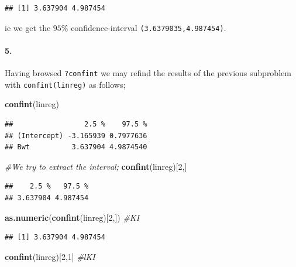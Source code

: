 \documentclass[
]{article}
\newenvironment{Shaded}{\begin{snugshade}}{\end{snugshade}}
\newcommand{\CommentTok}[1]{\textcolor[rgb]{0.56,0.35,0.01}{\textit{#1}}}
\newcommand{\DecValTok}[1]{\textcolor[rgb]{0.00,0.00,0.81}{#1}}
\newcommand{\KeywordTok}[1]{\textcolor[rgb]{0.13,0.29,0.53}{\textbf{#1}}}
\newcommand{\NormalTok}[1]{#1}
\begin{document}
\begin{verbatim}
## [1] 3.637904 4.987454
\end{verbatim}

ie we get the \(95\%\) confidence-interval
\texttt{(3.6379035,4.987454)}.

\hypertarget{section-7}{%
\paragraph{\texorpdfstring{\textbf{5.}}{5.}}\label{section-7}}

Having browsed \texttt{?confint} we may refind the results of the
previous subproblem with \texttt{confint(linreg)} as follows;

\begin{Shaded}
\begin{Highlighting}[]
\KeywordTok{confint}\NormalTok{(linreg)}
\end{Highlighting}
\end{Shaded}

\begin{verbatim}
##                 2.5 %    97.5 %
## (Intercept) -3.165939 0.7977636
## Bwt          3.637904 4.9874540
\end{verbatim}

\begin{Shaded}
\begin{Highlighting}[]
\CommentTok{#We try to extract the interval;}
\KeywordTok{confint}\NormalTok{(linreg)[}\DecValTok{2}\NormalTok{,]}
\end{Highlighting}
\end{Shaded}

\begin{verbatim}
##    2.5 %   97.5 % 
## 3.637904 4.987454
\end{verbatim}

\begin{Shaded}
\begin{Highlighting}[]
\KeywordTok{as.numeric}\NormalTok{(}\KeywordTok{confint}\NormalTok{(linreg)[}\DecValTok{2}\NormalTok{,]) }\CommentTok{#KI}
\end{Highlighting}
\end{Shaded}

\begin{verbatim}
## [1] 3.637904 4.987454
\end{verbatim}

\begin{Shaded}
\begin{Highlighting}[]
\KeywordTok{confint}\NormalTok{(linreg)[}\DecValTok{2}\NormalTok{,}\DecValTok{1}\NormalTok{] }\CommentTok{#lKI}
\end{Highlighting}
\end{Shaded}
\end{document}
